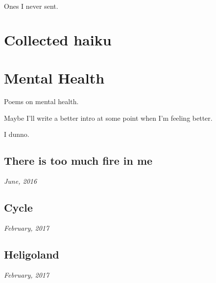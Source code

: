 \documentclass[10pt]{memoir}
\begin{document}
  \hfill Ones I never sent.
  \thispagestyle{empty}
  \newpage


  


  \chapter{Collected haiku}
  \thispagestyle{empty}
  \newpage


  


  \chapter{Mental Health}

  Poems on mental health.

  \vfill

  \noindent Maybe I'll write a better intro at some point when I'm feeling better.

  \vfill

  \hfill I dunno.
  \thispagestyle{empty}
  \newpage


  \section{There is too much fire in me}

  \hfill\textit{June, 2016}

  
  \newpage


  \section{Cycle}

  \hfill\textit{February, 2017}

  
  \newpage


  \section{Heligoland}

  \hfill\textit{February, 2017}

  
\end{document}
